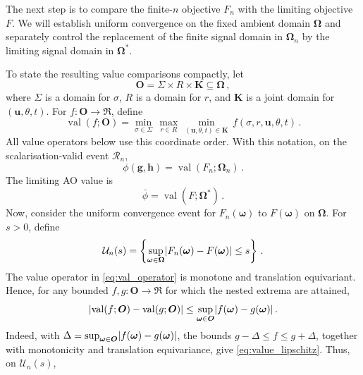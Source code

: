 \documentclass{article}
\makeatletter
\theoremstyle{definition}
\newcommand{\abs}[1]{%
	\ensuremath{%
		\if@display
		\left| #1 \right|
		\else
		\lvert #1 \rvert
		\fi
	}%
}
\newcommand*{\bb}{\boldsymbol}
\def\bu{\bb{u}}
\def\bh{\bb{h}}
\def\bg{\bb{g}}
\makeatother
\begin{document}
\begin{bibunit}
The next step is to compare the finite-$n$ objective $F_n$ with the
limiting objective $F$. We will establish uniform convergence on the fixed
ambient domain $\bb\Omega$ and separately control the replacement of the
finite signal domain in $\bb\Omega_n$ by the limiting signal domain in
$\bb\Omega^*$.

To state the resulting value comparisons compactly, let
$$
    \bb O
    =
    \Sigma\times R\times \bb K
    \subseteq
    \bb\Omega\,,
$$
where $\Sigma$ is a domain for $\sigma$, $R$ is a domain for $r$, and
$\bb K$ is a joint domain for $(\bu,\theta,t)$. For
$f:\bb O\to\Re$, define
\begin{equation}
\label{eq:val_operator}
    \operatorname{val}(f;\bb O)
    =
    \underset{\sigma\in\Sigma}{\min}\,
    \underset{r\in R}{\max}\,
    \underset{(\bu,\theta,t)\in \bb K}{\min}\,
    f(\sigma,r,\bu,\theta,t)\,.
\end{equation}
All value operators below use this coordinate order.
With this notation, on the scalarisation-valid event $\mathcal R_n$,
\begin{equation}
	\label{eq:AO_as_val_Fn}
	\phi(\bg,\bh)
	=
	\operatorname{val}(F_n;\bb\Omega_n)\,.
\end{equation}
The limiting AO value is
\begin{equation}
	\label{eq:bar_phi_val}
	\bar\phi
	=
	\operatorname{val}(F;\bb\Omega^*)\,.
\end{equation}
Now, consider the uniform convergence event for $F_n(\bb \omega)$ to $F(\bb \omega)$ on $\bb \Omega$. For $s>0$, define
\begin{equation}
	\label{event:U_n}
	\mathcal U_n(s)
	=
	\left\{
		\underset{\bb\omega\in\bb\Omega}{\sup}
		\abs{
			F_n(\bb\omega)-F(\bb\omega)
		}
		\leq s
	\right\}\,.
\end{equation}
The value operator in \eqref{eq:val_operator} is monotone and translation
equivariant. Hence, for any bounded $f,g:\bb O\to\Re$ for which the nested
extrema are attained,
\begin{equation}
\label{eq:value_lipschitz}
    \abs{
        \operatorname{val}(f;\bb O)
        -
        \operatorname{val}(g;\bb O)
    }
    \leq
    \underset{\bb\omega\in\bb O}{\sup}
    \abs{
        f(\bb\omega)-g(\bb\omega)
    }\,.
\end{equation}
Indeed, with
$\Delta=\sup_{\bb\omega\in\bb O}\abs{f(\bb\omega)-g(\bb\omega)}$,
the bounds $g-\Delta\leq f\leq g+\Delta$, together with monotonicity and
translation equivariance, give \eqref{eq:value_lipschitz}.
Thus, on $\mathcal U_n(s)$,

\end{bibunit}
\end{document}
